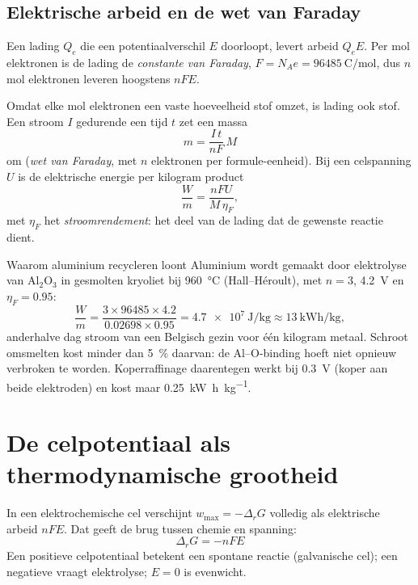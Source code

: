 \subsection{Elektrische arbeid en de wet van Faraday}
\label{sec:faraday}

Een lading $Q_e$ die een potentiaalverschil $E$ doorloopt, levert arbeid $Q_e E$. Per mol elektronen is de lading de \emph{constante van Faraday}, $F = N_A e = \SI{96485}{\coulomb\per\mole}$, dus $n$ mol elektronen leveren hoogstens $nFE$.

Omdat elke mol elektronen een vaste hoeveelheid stof omzet, is lading ook stof. Een stroom $I$ gedurende een tijd $t$ zet een massa
\begin{equation}
\boxed{\;m = \frac{I\,t}{nF}\,M\;}
\label{eq:faraday}
\end{equation}
om (\emph{wet van Faraday}, met $n$ elektronen per formule-eenheid). Bij een celspanning $U$ is de elektrische energie per kilogram product
\begin{equation}
\frac{W}{m} = \frac{nFU}{M\,\eta_F},
\label{eq:energie-per-kg}
\end{equation}
met $\eta_F$ het \emph{stroomrendement}: het deel van de lading dat de gewenste reactie dient.

\begin{toepassing}{Waarom aluminium recycleren loont}
Aluminium wordt gemaakt door elektrolyse van $\mathrm{Al_2O_3}$ in gesmolten kryoliet bij \SI{960}{\celsius} (Hall--H\'eroult), met $n = 3$, \SI{4.2}{\volt} en $\eta_F = 0.95$:
\[
\frac{W}{m} = \frac{3 \times 96485 \times 4.2}{0.02698 \times 0.95} = \SI{4.7e7}{\joule\per\kilogram} \approx \SI{13}{\kilo\watt\hour\per\kilogram},
\]
anderhalve dag stroom van een Belgisch gezin voor \'e\'en kilogram metaal. Schroot omsmelten kost minder dan \SI{5}{\percent} daarvan: de Al--O-binding hoeft niet opnieuw verbroken te worden. Koperraffinage daarentegen werkt bij \SI{0.3}{\volt} (koper aan beide elektroden) en kost maar \SI{0.25}{\kilo\watt\hour\per\kilogram}.
\end{toepassing}

\section{De celpotentiaal als thermodynamische grootheid}
\label{sec:celpotentiaal}

In een elektrochemische cel verschijnt $w_{\max} = -\Delta_rG$ volledig als elektrische arbeid $nFE$. Dat geeft de brug tussen chemie en spanning:
\begin{equation}
\boxed{\;\Delta_r G = -n F E\;}
\label{eq:drG-nFE}
\end{equation}
Een positieve celpotentiaal betekent een spontane reactie (galvanische cel); een negatieve vraagt elektrolyse; $E = 0$ is evenwicht.

